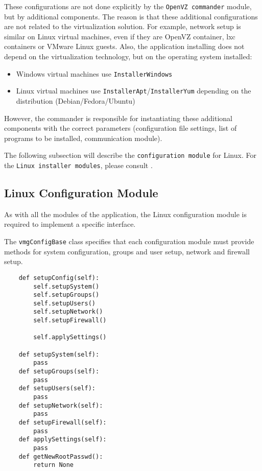 These configurations are not done explicitly by the \texttt{OpenVZ commander} module, 
but by additional components. The reason is that these additional configurations 
are not related to the virtualization solution. For example, network setup is similar 
on Linux virtual machines, even if they are OpenVZ container, lxc containers or 
VMware Linux guests. Also, the application installing does not depend on the 
virtualization technology, but on the operating system installed:
\begin{itemize}
  \item Windows virtual machines use \texttt{InstallerWindows}
  \item Linux virtual machines use \texttt{InstallerApt}/\texttt{InstallerYum} depending on the 
distribution (Debian/Fedora/Ubuntu)
\end{itemize}

However, the commander is responsible for instantiating these additional components 
with the correct parameters (configuration file settings, list of programs to be installed, 
communication module).

The following subsection will describe the \texttt{configuration module} for Linux. For the 
\texttt{Linux installer modules}, please consult .

\subsection*{Linux Configuration Module} \label{sec:linux-conf}
As with all the modules of the application, the Linux configuration module is 
required to implement a specific interface.
\\

The \texttt{vmgConfigBase} class specifies that each configuration module must 
provide methods for system configuration, groups and user setup, network and 
firewall setup.
\\
\lstset{language=Python,caption=Configuration module interface,
label=lst:if-configure}
\begin{lstlisting}
	def setupConfig(self):
		self.setupSystem()
		self.setupGroups()
		self.setupUsers()
		self.setupNetwork()
		self.setupFirewall()

		self.applySettings()

	def setupSystem(self):
		pass
	def setupGroups(self):
		pass
	def setupUsers(self):
		pass
	def setupNetwork(self):
		pass
	def setupFirewall(self):
		pass
	def applySettings(self):
		pass
	def getNewRootPasswd():
		return None
\end{lstlisting}

